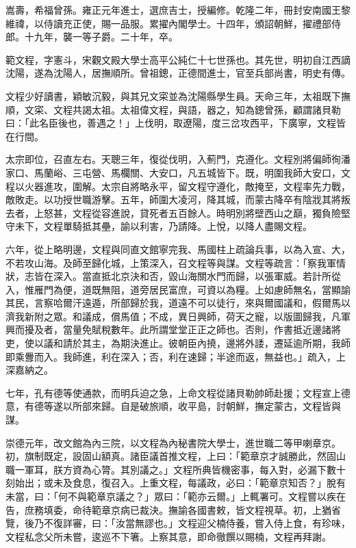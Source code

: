 \begin{pinyinscope}
嵩壽，希福曾孫。雍正元年進士，選庶吉士，授編修。乾隆二年，冊封安南國王黎維禕，以侍讀充正使，賜一品服。累擢內閣學士。十四年，頒詔朝鮮，擢禮部侍郎。十九年，襲一等子爵。二十年，卒。

範文程，字憲斗，宋觀文殿大學士高平公純仁十七世孫也。其先世，明初自江西謫沈陽，遂為沈陽人，居撫順所。曾祖鏓，正德間進士，官至兵部尚書，明史有傳。

文程少好讀書，穎敏沉毅，與其兄文寀並為沈陽縣學生員。天命三年，太祖既下撫順，文寀、文程共謁太祖。太祖偉文程，與語，器之，知為鏓曾孫，顧謂諸貝勒曰：「此名臣後也，善遇之！」上伐明，取遼陽，度三岔攻西平，下廣寧，文程皆在行間。

太宗即位，召直左右。天聰三年，復從伐明，入薊門，克遵化。文程別將偏師徇潘家口、馬蘭峪、三屯營、馬欄關、大安口，凡五城皆下。既，明圍我師大安口，文程以火器進攻，圍解。太宗自將略永平，留文程守遵化，敵掩至，文程率先力戰，敵敗走。以功授世職游擊。五年，師圍大凌河，降其城，而蒙古降卒有陰戕其將叛去者，上怒甚，文程從容進說，貸死者五百餘人。時明別將壁西山之巔，獨負險堅守未下，文程單騎抵其壘，諭以利害，乃請降。上悅，以降人盡賜文程。

六年，從上略明邊，文程與同直文館寧完我、馬國柱上疏論兵事，以為入宣、大，不若攻山海。及師至歸化城，上策深入，召文程等與謀。文程等疏言：「察我軍情狀，志皆在深入。當直抵北京決和否，毀山海關水門而歸，以張軍威。若計所從入，惟雁門為便，道既無阻，道旁居民富庶，可資以為糧。上如慮師無名，當顯諭其民，言察哈爾汗遠遁，所部歸於我，道遠不可以徒行，來與爾國議和，假爾馬以濟我新附之眾。和議成，償馬值；不成，異日興師，荷天之寵，以版圖歸我，凡軍興而擾及者，當量免賦稅數年。此所謂堂堂正正之師也。否則，作書抵近邊諸將吏，使以議和請於其主，為期決進止。彼朝臣內撓，邊將外諉，遷延逾所期，我師即乘釁而入。我師進，利在深入；否，利在速歸；半途而返，無益也。」疏入，上深嘉納之。

七年，孔有德等使通款，而明兵迫之急，上命文程從諸貝勒帥師赴援；文程宣上德意，有德等遂以所部來歸。自是破旅順，收平島，討朝鮮，撫定蒙古，文程皆與謀。

崇德元年，改文館為內三院，以文程為內秘書院大學士，進世職二等甲喇章京。初，旗制既定，設固山額真。諸臣議首推文程，上曰：「範章京才誠勝此，然固山職一軍耳，朕方資為心膂。其別議之。」文程所典皆機密事，每入對，必漏下數十刻始出；或未及食息，復召入。上重文程，每議政，必曰：「範章京知否？」脫有未當，曰：「何不與範章京議之？」眾曰：「範亦云爾。」上輒署可。文程嘗以疾在告，庶務填委，命待範章京病已裁決。撫諭各國書敕，皆文程視草。初，上猶省覽，後乃不復詳審，曰：「汝當無謬也。」文程迎父楠侍養，嘗入侍上食，有珍味，文程私念父所未嘗，逡巡不下箸。上察其意，即命徹饌以賜楠，文程再拜謝。


\end{pinyinscope}
